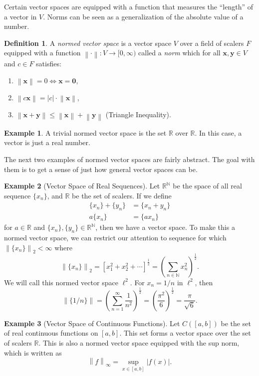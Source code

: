 \documentclass{article}
\newcommand{\N}{\mathbb{N}}
\newcommand{\R}{\mathbb{R}}
\newcommand{\x}{\mathbf{x}}
\newcommand{\y}{\mathbf{y}}
\newcommand{\ze}{\mathbf{0}}
\newcommand{\norm}[1]{\left\lVert#1\right\rVert}
\theoremstyle{definition}
\newtheorem{definition}{Definition}[section]
\newtheorem{example}{Example}[section]
\begin{document}
	Certain vector spaces are equipped with a function that measures the ``length'' of a vector in $ V $. Norms can be seen as a generalization of the absolute value of a number.
	\begin{definition}
		A \textit{\color{red}normed vector space} is a vector space $ V $ over a field of scalers $ F $ equipped with a function $\norm{\cdot}:V\to[0,\infty)$ called a \textit{\color{red}norm} which for all $ \x,\y\in V $ and $ c\in F $ satisfies:
		\begin{enumerate}
			\item $ \norm{\x}=0\iff \x=\ze$,
			\item $ \norm{c\x}=|c|\cdot \norm{\x} $,
			\item $ \norm{\x+\y}\le\norm{\x}+\norm{\y} $ (Triangle Inequality).
		\end{enumerate} 
	\end{definition}
	\begin{example}
		A trivial normed vector space is the set $ \R $ over $ \R $. In this case, a vector is just a real number. 
	\end{example}
	The next two examples of normed vector spaces are fairly abstract. The goal with them is to get a sense of just how general vector spaces can be.
	\begin{example}[Vector Space of Real Sequences]
		Let $ \R^\N $ be the space of all real sequence $ \{x_n\} $, and $ \R $ be the set of scalers. If we define \begin{align*}
			\{x_n\}+\{y_n\}&=\{x_n+y_n\}\\
			a\{x_n\}&=\{ax_n \}
		\end{align*}
		for $ a\in\R $ and $ \{x_n\},\{y_n\}\in\R^\N $, then we have a vector space. To make this a normed vector space, we can restrict our attention to sequence for which $ \norm{\{x_n\}}_2<\infty $ where $$ \norm{\{x_n\}}_2=\left[x_1^2+x_2^2+\cdots\right]^\frac{1}{2}=\left(\sum_{n\in\N}x_n^2\right)^\frac{1}{2}.$$  We will call this normed vector space $ \ell^2 $. For $ x_n=1/n $ in $ \ell^2 $, then $$\norm{\{1/n\}}=\left(\sum_{n=1}^\infty\frac{1}{n^2}\right)^\frac{1}{2}=\left(\frac{\pi^2}{6}\right)^\frac{1}{2}=\frac{\pi}{\sqrt{6}} .$$ 
	\end{example}
	\begin{example}[Vector Space of Continuous Functions]
		Let $ C([a,b]) $ be the set of real continuous functions on $ [a,b] $. This set forms a vector space over the set of scalers $ \R $. This is also a normed vector space equipped with the sup norm, which is written as $$\norm{f}_\infty=\sup_{x\in [a,b]}|f(x)| .$$
	\end{example}
\end{document}
